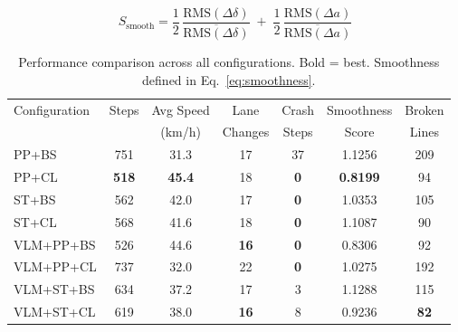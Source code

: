 %
\begin{equation}
  S_{\text{smooth}} = \frac{1}{2}\,\frac{\mathrm{RMS}(\Delta\delta)}{\overline{\mathrm{RMS}(\Delta\delta)}}
  \;+\; \frac{1}{2}\,\frac{\mathrm{RMS}(\Delta a)}{\overline{\mathrm{RMS}(\Delta a)}}
  \label{eq:smoothness}
\end{equation}

\begin{table}[htbp]
\centering
\caption{Performance comparison across all configurations. Bold = best. Smoothness defined in Eq.~\eqref{eq:smoothness}.}
\label{tab:full_comparison}
\small
\begin{tabular}{l c c c c c c}
\toprule
Configuration & Steps & Avg Speed & Lane & Crash & Smoothness & Broken \\
              &       & (km/h)    & Changes & Steps & Score & Lines \\
\midrule
PP+BS & 751 & 31.3 & 17 & 37 & 1.1256 & 209 \\
PP+CL & \textbf{518} & \textbf{45.4} & 18 & \textbf{0} & \textbf{0.8199} & 94 \\
ST+BS & 562 & 42.0 & 17 & \textbf{0} & 1.0353 & 105 \\
ST+CL & 568 & 41.6 & 18 & \textbf{0} & 1.1087 & 90 \\
\midrule
VLM+PP+BS & 526 & 44.6 & \textbf{16} & \textbf{0} & 0.8306 & 92 \\
VLM+PP+CL & 737 & 32.0 & 22 & \textbf{0} & 1.0275 & 192 \\
VLM+ST+BS & 634 & 37.2 & 17 & 3 & 1.1288 & 115 \\
VLM+ST+CL & 619 & 38.0 & \textbf{16} & 8 & 0.9236 & \textbf{82} \\
\bottomrule
\end{tabular}
\end{table}

